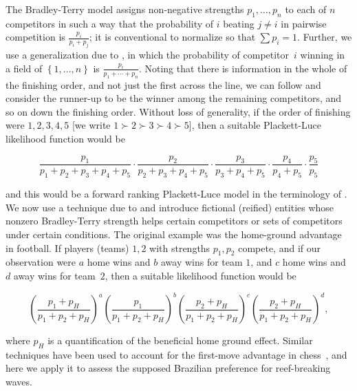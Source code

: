 \documentclass{article}
\begin{document}
The Bradley-Terry model \citep{bradley1954} assigns non-negative
strengths $p_1,\ldots, p_n$ to each of $n$ competitors in such a way
that the probability of $i$ beating $j\neq i$ in pairwise competition
is $\frac{p_i}{p_i+p_j}$; it is conventional to normalize so that
$\sum p_i=1$.  Further, we use a generalization due to
\citep{luce1959}, in which the probability of competitor~$i$ winning
in a field of $\left\lbrace 1,\ldots, n\right\rbrace$ is
$\frac{p_i}{p_1+\cdots +p_n}$.  Noting that there is information in
the whole of the finishing order, and not just the first across the
line, we can follow \citet{plackett1975} and consider the runner-up to
be the winner among the remaining competitors, and so on down the
finishing order. Without loss of generality, if the order of finishing
were $1,2,3,4,5$ [we write $1\succ 2\succ 3\succ 4\succ5$], then a
suitable Plackett-Luce likelihood function would be

\begin{equation}\label{competitors_1_to_5_likelihood}
\frac{p_1}{p_1+p_2+p_3+p_4+p_5}\cdot
\frac{p_2}{p_2+p_3+p_4+p_5}\cdot
\frac{p_3}{p_3+p_4+p_5}\cdot
\frac{p_4}{p_4+p_5}\cdot
\frac{p_5}{p_5}
\end{equation}

and this would be a forward ranking Plackett-Luce model in the
terminology of \citet{johnson2020}.  We now use a technique due to
\citet{hankin2010,hankin2017} and introduce fictional (reified)
entities whose nonzero Bradley-Terry strength helps certain
competitors or sets of competitors under certain conditions.  The
original example was the home-ground advantage in football.  If
players (teams) $1,2$ with strengths $p_1,p_2$ compete, and if our
observation were $a$ home wins and $b$ away wins for team $1$, and $c$
home wins and $d$ away wins for team~$2$, then a suitable likelihood
function would be

\begin{equation}\label{home_ground_advantage}
\left(\frac{p_1+p_H}{p_1+p_2+p_H}\right)^a
\left(\frac{p_1}{p_1+p_2+p_H}\right)^b
\left(\frac{p_2+p_H}{p_1+p_2+p_H}\right)^c
\left(\frac{p_2+p_H}{p_1+p_2+p_H}\right)^d,
\end{equation}

\noindent where $p_H$ is a quantification of the beneficial home
ground effect.  Similar techniques have been used to account for the
first-move advantage in chess~\citep{hankin2020}, and here we apply it
to assess the supposed Brazilian preference for reef-breaking waves.
\end{document}
